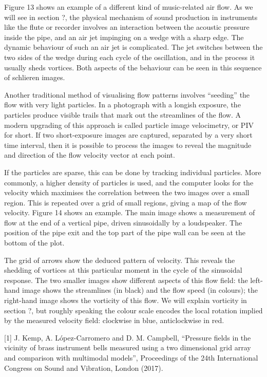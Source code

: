   Figure 13 shows an example of a different kind of music-related air flow. As 
  we will see in section ?, the physical mechanism of sound production in 
  instruments like the flute or recorder involves an interaction between the 
  acoustic pressure inside the pipe, and an air jet impinging on a wedge with a 
  sharp edge. The dynamic behaviour of such an air jet is complicated. The jet 
  switches between the two sides of the wedge during each cycle of the 
  oscillation, and in the process it usually sheds vortices. Both aspects of 
  the behaviour can be seen in this sequence of schlieren images. 

  Another traditional method of visualising flow patterns involves “seeding” 
  the flow with very light particles. In a photograph with a longish exposure, 
  the particles produce visible trails that mark out the streamlines of the 
  flow. A modern upgrading of this approach is called particle image 
  velocimetry, or PIV for short. If two short-exposure images are captured, 
  separated by a very short time interval, then it is possible to process the 
  images to reveal the magnitude and direction of the flow velocity vector at 
  each point. 

  If the particles are sparse, this can be done by tracking individual 
  particles. More commonly, a higher density of particles is used, and the 
  computer looks for the velocity which maximises the correlation between the 
  two images over a small region. This is repeated over a grid of small 
  regions, giving a map of the flow velocity. Figure 14 shows an example. The 
  main image shows a measurement of flow at the end of a vertical pipe, driven 
  sinusoidally by a loudspeaker. The position of the pipe exit and the top part 
  of the pipe wall can be seen at the bottom of the plot. 

  The grid of arrows show the deduced pattern of velocity. This reveals the 
  shedding of vortices at this particular moment in the cycle of the sinusoidal 
  response. The two smaller images show different aspects of this flow field: 
  the left-hand image shows the streamlines (in black) and the flow speed (in 
  colours); the right-hand image shows the vorticity of this flow. We will 
  explain vorticity in section ?, but roughly speaking the colour scale encodes 
  the local rotation implied by the measured velocity field: clockwise in blue, 
  anticlockwise in red. 



  \sectionreferences{}[1] J. Kemp, A. López-Carromero and D. M. Campbell, 
  “Pressure fields in the vicinity of brass instrument bells measured using a 
  two dimensional grid array and comparison with multimodal models”, 
  Proceedings of the 24th International Congress on Sound and Vibration, London 
  (2017). 

